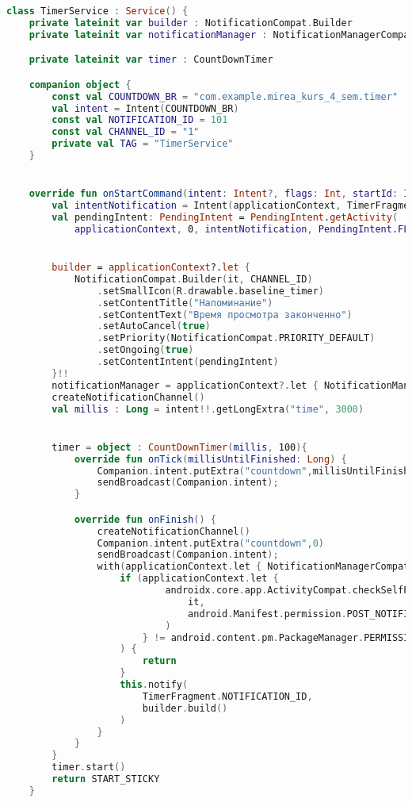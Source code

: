 \begin{lstlisting}[language=Kotlin, caption=\leftline{TimerService}, label=lst:TimerService]
class TimerService : Service() {
    private lateinit var builder : NotificationCompat.Builder
    private lateinit var notificationManager : NotificationManagerCompat

    private lateinit var timer : CountDownTimer

    companion object {
        const val COUNTDOWN_BR = "com.example.mirea_kurs_4_sem.timer"
        val intent = Intent(COUNTDOWN_BR)
        const val NOTIFICATION_ID = 101
        const val CHANNEL_ID = "1"
        private val TAG = "TimerService"
    }


    override fun onStartCommand(intent: Intent?, flags: Int, startId: Int): Int {
        val intentNotification = Intent(applicationContext, TimerFragment::class.java)
        val pendingIntent: PendingIntent = PendingIntent.getActivity(
            applicationContext, 0, intentNotification, PendingIntent.FLAG_IMMUTABLE)


        builder = applicationContext?.let {
            NotificationCompat.Builder(it, CHANNEL_ID)
                .setSmallIcon(R.drawable.baseline_timer)
                .setContentTitle("Напоминание")
                .setContentText("Время просмотра законченно")
                .setAutoCancel(true)
                .setPriority(NotificationCompat.PRIORITY_DEFAULT)
                .setOngoing(true)
                .setContentIntent(pendingIntent)
        }!!
        notificationManager = applicationContext?.let { NotificationManagerCompat.from(it) }!!
        createNotificationChannel()
        val millis : Long = intent!!.getLongExtra("time", 3000)


        timer = object : CountDownTimer(millis, 100){
            override fun onTick(millisUntilFinished: Long) {
                Companion.intent.putExtra("countdown",millisUntilFinished);
                sendBroadcast(Companion.intent);
            }

            override fun onFinish() {
                createNotificationChannel()
                Companion.intent.putExtra("countdown",0)
                sendBroadcast(Companion.intent);
                with(applicationContext.let { NotificationManagerCompat.from(it) }) {
                    if (applicationContext.let {
                            androidx.core.app.ActivityCompat.checkSelfPermission(
                                it,
                                android.Manifest.permission.POST_NOTIFICATIONS
                            )
                        } != android.content.pm.PackageManager.PERMISSION_GRANTED
                    ) {
                        return
                    }
                    this.notify(
                        TimerFragment.NOTIFICATION_ID,
                        builder.build()
                    )
                }
            }
        }
        timer.start()
        return START_STICKY
    }



\end{lstlisting}
